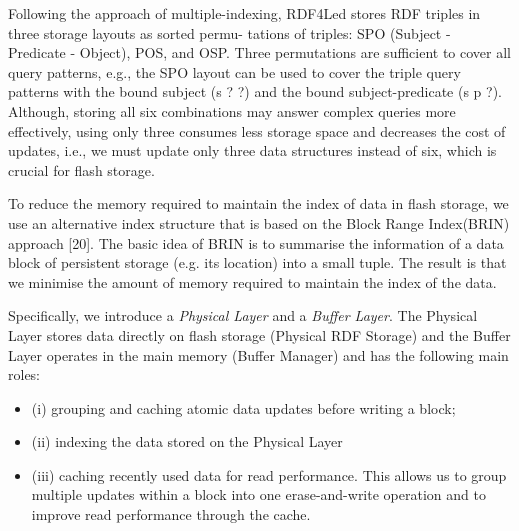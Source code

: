 

Following the approach of multiple-indexing, RDF4Led
stores RDF triples in three storage layouts as sorted permu-
tations of triples: SPO (Subject - Predicate - Object), POS,
and OSP. 
Three permutations are sufficient to cover all query patterns, e.g., the SPO layout can be used to cover the triple query patterns with the bound subject (s ? ?) and the bound
subject-predicate (s p ?). 
Although, storing all six combinations may answer complex queries more effectively, using only three consumes less storage space and decreases the cost of updates, i.e., we must update only three data structures instead of six, which is crucial for flash storage.

To reduce the memory required to maintain the index of data in flash storage, we use an alternative index structure that is based on the Block Range Index(BRIN) approach [20]. 
The basic idea of BRIN is to summarise the information of a data block of persistent storage (e.g. its location) into a small tuple. 
The result is that we minimise the amount of memory required to maintain the index of the data.


Specifically, we introduce a \emph{Physical Layer} and a \emph{Buffer Layer}. 
The Physical Layer stores data directly on flash storage (Physical RDF Storage) and the Buffer Layer operates in the main memory (Buffer Manager) and has the following main roles: 
\begin{itemize}
\item (i) grouping and caching atomic data updates before writing a block; 
\item (ii) indexing the data stored on the Physical Layer 
\item (iii) caching recently used data for read performance. This allows us to group multiple updates within a block into one erase-and-write operation and to improve read performance through the cache.
\end{itemize}


